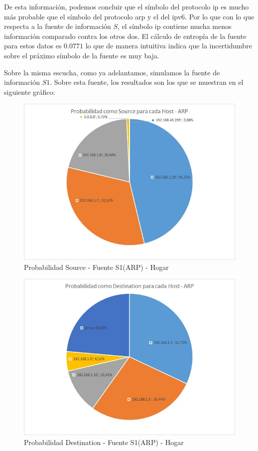 De esta información, podemos concluir que el símbolo del protocolo ip es mucho más probable que el símbolo del protocolo arp y el del ipv6. Por lo que con lo que respecta a la fuente de información $S$, el símbolo ip contiene mucha menos información comparado contra los otros dos. El cálculo de entropía de la fuente para estos datos es $0.0771$ lo que de manera intuitiva indica que la incertidumbre sobre el práximo símbolo de la fuente es muy baja.

Sobre la misma escucha, como ya adelantamos, simulamos la fuente de información $S1$. Sobre esta fuente, los resultados son los que se muestran en el siguiente gráfico:

\begin{figure}[h!]
\centering
\includegraphics[scale=0.7]{./img/proba_src_casa.jpg}
\caption{Probabilidad Source - Fuente S1(ARP) - Hogar}
\end{figure}

\begin{figure}[h!]
\centering
\includegraphics[scale=0.7]{./img/proba_dst_casa.jpg}
\caption{Probabilidad Destination - Fuente S1(ARP) - Hogar}
\end{figure}
\newpage

